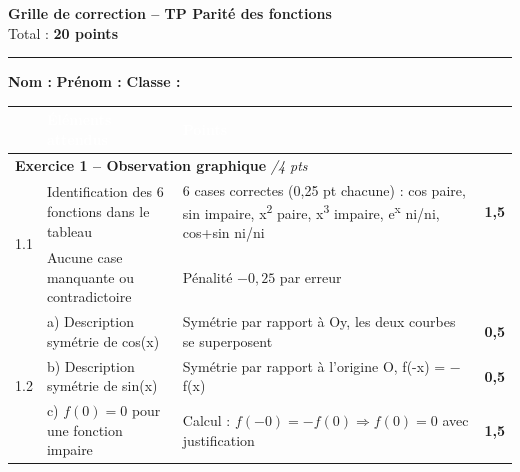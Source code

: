 \documentclass[12pt,a4paper]{article}
\begin{document}
\thispagestyle{fancy}

\begin{center}
    {\LARGE \textbf{Grille de correction -- TP Parité des fonctions}}\\[4pt]
    {\large\color{gray} Total : \textbf{20 points}}
\end{center}

\hrule\medskip

\noindent\textbf{Nom :} \dotfill \quad \textbf{Prénom :} \dotfill \quad \textbf{Classe :} \makebox[3cm]{\dotfill}

\bigskip

\renewcommand{\arraystretch}{1.7}
\begin{tabular}{|p{0.5cm}|p{7.5cm}|p{5.5cm}|c|}
    \hline
    \rowcolor[RGB]{70,130,220}
    \multicolumn{2}{|l|}{\textcolor{white}{\textbf{Critère évalué}}} & \textcolor{white}{\textbf{Éléments attendus}} & \textcolor{white}{\textbf{Points}} \\
    \hline

    \multicolumn{4}{|l|}{\cellcolor{exobg}\textbf{Exercice 1 -- Observation graphique} \hfill \textit{/4 pts}} \\
    \hline
    \multirow{2}{*}{1.1} & Identification des 6 fonctions dans le tableau
    & 6 cases correctes (0,25 pt chacune) : cos paire, sin impaire, x\textsuperscript{2} paire, x\textsuperscript{3} impaire, e\textsuperscript{x} ni/ni, cos+sin ni/ni
    & \textbf{1,5} \\
    \cline{2-4}
    & Aucune case manquante ou contradictoire & Pénalité $-0,25$ par erreur & \\
    \hline
    \multirow{3}{*}{1.2} & a) Description symétrie de cos(x) & Symétrie par rapport à Oy, les deux courbes se superposent & \textbf{0,5} \\
    \cline{2-4}
    & b) Description symétrie de sin(x) & Symétrie par rapport à l'origine O, f(-x) = $-$f(x) & \textbf{0,5} \\
    \cline{2-4}
    & c) $f(0) = 0$ pour une fonction impaire & Calcul : $f(-0)=-f(0) \Rightarrow f(0)=0$ avec justification & \textbf{1,5} \\
    \hline


\end{tabular}
\end{document}
